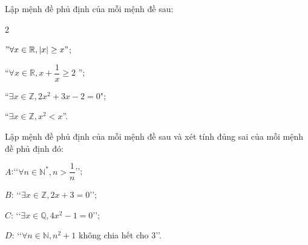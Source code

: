 \begin{bt}%
	Lập mệnh đề phủ định của mỗi mệnh đề sau:
	\begin{enumEX}{2}
		\item[$A\colon$] $"\forall x \in \mathbb{R},|x| \geq x"$;
		\item [$B\colon$] ``$\forall x \in \mathbb{R}, x+\dfrac{1}{x} \geq 2$ '';
		\item [$C\colon$] ``$\exists x \in \mathbb{Z}, 2 x^{2}+3 x-2=0$";
		\item [$D\colon$] ``$\exists x \in \mathbb{Z}, x^{2}<x$''.
	\end{enumEX}
\end{bt}

\begin{bt}%
	Lập mệnh đề phủ định của mỗi mệnh đề sau và xét tính đủng sai của mỗi mệnh đề phủ định đó:
	\begin{listEX}[2]
		\item[a)] $A$:\lq\lq $\forall n \in \mathbb{N}^*, n>\dfrac{1}{n}$\rq\rq;
		\item[b)] $B$: \lq\lq $\exists x \in \mathbb{Z}, 2 x+3=0$\rq\rq;
		\item[c)] $C$: \lq\lq $\exists x \in \mathbb{Q}, 4 x^2-1=0$\rq\rq;
		\item[d)] $D$: \lq\lq $\forall n \in \mathbb{N}, n^2+1$ không chia hết cho $3$\rq\rq.
	\end{listEX}
\end{bt}

